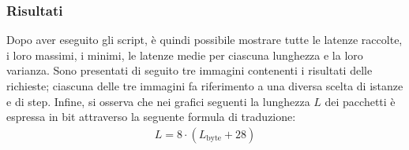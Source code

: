 \vspace{10px}\subsubsection*{Risultati}

\noindent Dopo aver eseguito gli script, è quindi possibile mostrare tutte le latenze raccolte, i loro massimi, i minimi, le latenze medie per ciascuna lunghezza e la loro varianza. Sono presentati di seguito tre immagini contenenti i risultati delle richieste; ciascuna delle tre immagini fa riferimento a una diversa scelta di istanze e di step. Infine, si osserva che nei grafici seguenti la lunghezza $L$ dei pacchetti è espressa in bit attraverso la seguente formula di traduzione:
\begin{gather*}
    L = 8 \cdot (L_{\text{byte}} + 28)
\end{gather*}


